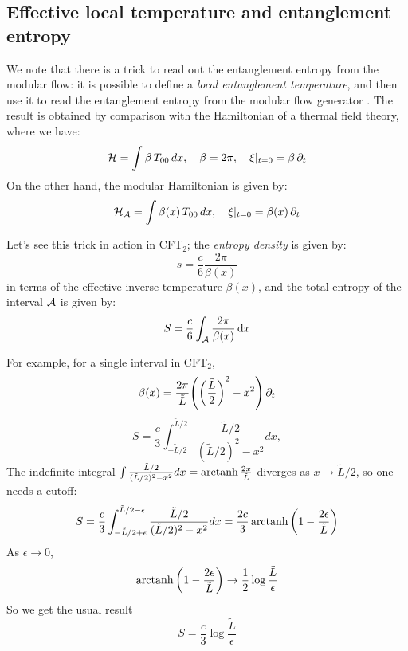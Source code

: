 \documentclass[11pt,a4paper]{article}
\begin{document}
\subsection{Effective local temperature and entanglement entropy}
	
	We note that there is a trick to read out the entanglement entropy from the modular flow: it is possible to define a \textit{local entanglement temperature}, and then use it to read the entanglement entropy from the modular flow generator \cite{Wong:2013gua,Cardy:2016fqc}. The result is obtained by comparison with the Hamiltonian of a thermal field theory, where we have:
	\begin{equation}
	\mathcal{H}=\int \beta\,T_{00}\,dx,\quad \beta = 2\pi,
	\quad \xi|_{t=0} = \beta\,\partial_{t}
	\label{eq:beta_thermal}
	\end{equation}
	On the other hand, the modular Hamiltonian is given by:
	\begin{equation}
	\mathcal{H}_{\mathcal{A}}=\int \beta(x)\, T_{00}\,dx,\quad \xi|_{t=0} = \beta(x)\, \partial_{t}
	\end{equation}
	
	Let's see this trick in action in CFT$_2$; the \textit{entropy density} is given by:
	\begin{equation}
	s = \frac{c}{6} \frac{2\pi}{\beta(x)}
	\end{equation}
	in terms of the effective inverse temperature $\beta(x)$, and the total entropy of the interval $\mathcal{A}$ is given by:
	\begin{equation}
	S = \frac{c}{6}
		\int_{\mathcal{A}} \frac{2\pi}{\beta(x)} \dd{x}
	\end{equation}
	
	For example, for a single interval in CFT$_2$,
	\begin{equation}
		\beta(x)
		= \frac{2\pi}{{\tilde L}}
			\pqty{
				\pqty{\frac{{\tilde L}}{2}}^2
				- x^2
			} \,\pdd{t}
	\end{equation}
	\begin{equation}
	S= \frac{c}{3} \int_{-{\tilde L}/2}^{{\tilde L}/2}
			\frac{{\tilde L}/2}{({\tilde L}/2)^2-x^2}dx,
	\end{equation}
	The indefinite integral $
		\int \frac{{\tilde L}/2}{({\tilde L}/2)^2-x^2}dx
		= \operatorname{arctanh}\frac{2x}{{\tilde L}}
	$ diverges as $x\rightarrow {\tilde L}/2$, so one needs a cutoff:
	\begin{equation}
	S=\frac{c}{3}\int_{-{\tilde L}/2+\epsilon}^{{\tilde L}/2-\epsilon}
		\frac{{\tilde L}/2}{({\tilde L}/2)^2-x^2}dx
	=\frac{2c}{3} \mop{arctanh} \pqty{
			1-\frac{2\epsilon}{{\tilde L}}
		}
	\end{equation}
	As $\epsilon\rightarrow 0$,
	\begin{equation}
		\mop{arctanh} \pqty{
			1-\frac{2\epsilon}{{\tilde L}}
		}\rightarrow \frac{1}{2}\log\frac{{\tilde L}}{\epsilon}
	\end{equation}
	So we get the usual result
	\begin{equation}
	S=\frac{c}{3}\log\frac{{\tilde L}}{\epsilon}
	\end{equation}
	
\end{document}
